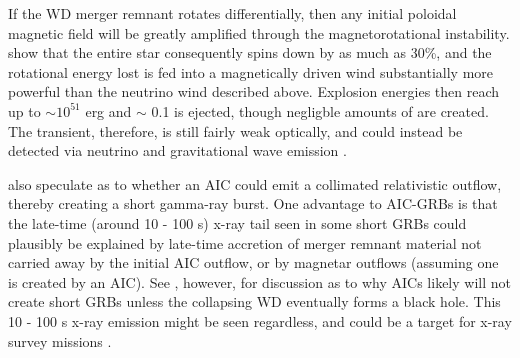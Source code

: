 If the WD merger remnant rotates differentially, then any initial poloidal magnetic field will be greatly amplified through the magnetorotational instability.  \cite{dess+07} show that the entire star consequently spins down by as much as 30\%, and the rotational energy lost is fed into a magnetically driven wind substantially more powerful than the neutrino wind described above.  Explosion energies then reach up to $\sim 10^{51}$ erg and $\sim$ 0.1 {\Msun} is ejected, though negligble amounts of {\Ni} are created.  The transient, therefore, is still fairly weak optically, and could instead be detected via neutrino and gravitational wave emission \citep{dess+07}.

\citeauthor{metz+09} also speculate as to whether an AIC could emit a collimated relativistic outflow, thereby creating a short gamma-ray burst.  One advantage to AIC-GRBs is that the late-time (around 10 - 100 s) x-ray tail seen in some short GRBs could plausibly be explained by late-time accretion of merger remnant material not carried away by the initial AIC outflow, or by magnetar outflows (assuming one is created by an AIC).  See \cite{dess+07}, however, for discussion as to why AICs likely will not create short GRBs unless the collapsing WD eventually forms a black hole.  This 10 - 100 s x-ray emission might be seen regardless, and could be a target for x-ray survey missions \citep{metz+09}.



